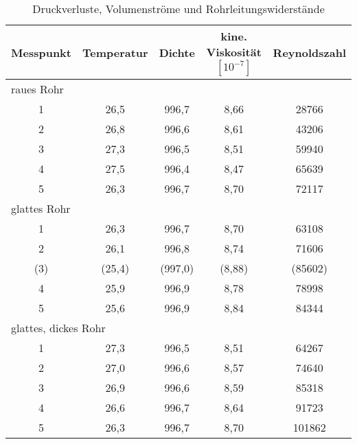 \vspace*{-10.5mm}
\renewcommand{\arraystretch}{1.2}
\begin{table}[h!]
	\centering
	\caption{Druckverluste, Volumenströme und Rohrleitungswiderstände}
	\label{tab:excel}
	\begin{tabular}{c|c|c|c|c}
		\textbf{Messpunkt}	& \textbf{Temperatur} & \textbf{Dichte}	& \textbf{kine. Viskosität $\left[10^{-7}\right]$} & \textbf{Reynoldszahl}\\
		\hline
		\multicolumn{5}{l}{raues Rohr} \\
		\hline
		1&26,5&996,7&8,66&28766\\
		2&26,8&996,6&8,61&43206\\
		3&27,3&996,5&8,51&59940\\
		4&27,5&996,4&8,47&65639\\
		5&26,3&996,7&8,70&72117\\
		\hline
		\multicolumn{5}{l}{glattes Rohr} \\
		\hline
		1&26,3&996,7&8,70&63108\\
		2&26,1&996,8&8,74&71606\\
		(3)&(25,4)&(997,0)&(8,88)&(85602)\\
		4&25,9&996,9&8,78&78998\\
		5&25,6&996,9&8,84&84344\\
		\hline
		\multicolumn{5}{l}{glattes, dickes Rohr} \\
		\hline
		1&27,3&996,5&8,51&64267\\
		2&27,0&996,6&8,57&74640\\
		3&26,9&996,6&8,59&85318\\
		4&26,6&996,7&8,64&91723\\
		5&26,3&996,7&8,70&101862\\
	\end{tabular}
\end{table}
\FloatBarrier
\vspace*{-2.5mm}

